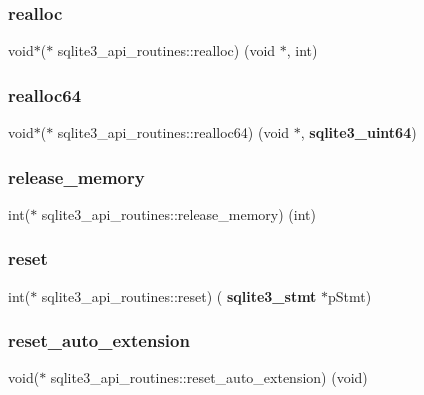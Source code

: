 \subsubsection{realloc}
{\footnotesize\ttfamily void$\ast$($\ast$ sqlite3\+\_\+api\+\_\+routines\+::realloc) (void $\ast$, int)}

\mbox{\label{structsqlite3__api__routines_ac840cfa13e7761011e5fbd0a7dce7a12}} 
\subsubsection{realloc64}
{\footnotesize\ttfamily void$\ast$($\ast$ sqlite3\+\_\+api\+\_\+routines\+::realloc64) (void $\ast$, \textbf{ sqlite3\+\_\+uint64})}

\mbox{\label{structsqlite3__api__routines_a34fba43ed54a03e129804659ccb379d1}} 
\subsubsection{release\_memory}
{\footnotesize\ttfamily int($\ast$ sqlite3\+\_\+api\+\_\+routines\+::release\+\_\+memory) (int)}

\mbox{\label{structsqlite3__api__routines_a88551d8943b8f9cdc7abebac90998ddf}} 
\subsubsection{reset}
{\footnotesize\ttfamily int($\ast$ sqlite3\+\_\+api\+\_\+routines\+::reset) (\textbf{ sqlite3\+\_\+stmt} $\ast$p\+Stmt)}

\mbox{\label{structsqlite3__api__routines_a4424e3f8a5f42d705b4619c16959ef4a}} 
\subsubsection{reset\_auto\_extension}
{\footnotesize\ttfamily void($\ast$ sqlite3\+\_\+api\+\_\+routines\+::reset\+\_\+auto\+\_\+extension) (void)}

